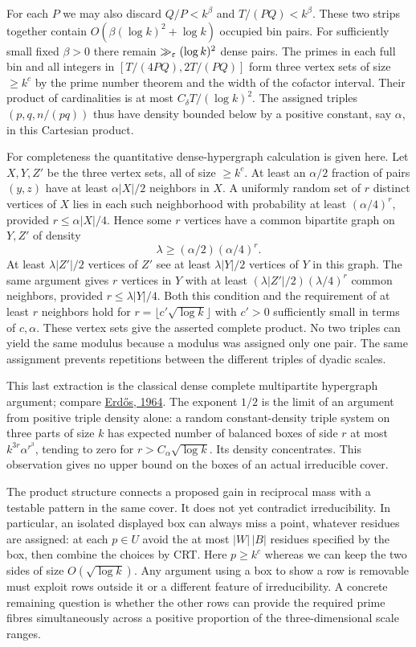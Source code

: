 For each $P$ we may also discard $Q/P<k^\beta$ and $T/(P Q)<k^\beta$. These two strips together contain $O(\beta(\log k)^2+\log k)$ occupied bin pairs. For sufficiently small fixed $\beta>0$ there remain $\gg_\varepsilon(\log k)^2$ dense pairs. The primes in each full bin and all integers in $[T/(4PQ),2T/(PQ)]$ form three vertex sets of size $\ge k^{c}$ by the prime number theorem and the width of the cofactor interval. Their product of cardinalities is at most $C_\delta T/(\log k)^2$. The assigned triples $(p,q,n/(pq))$ thus have density bounded below by a positive constant, say $\alpha$, in this Cartesian product.

\newpage
{}
For completeness the quantitative dense-hypergraph calculation is given here. Let $X,Y,Z'$ be the three vertex sets, all of size $\ge k^c$. At least an $\alpha/2$ fraction of pairs $(y,z)$ have at least $\alpha|X|/2$ neighbors in $X$. A uniformly random set of $r$ distinct vertices of $X$ lies in each such neighborhood with probability at least $(\alpha/4)^r$, provided $r\le\alpha|X|/4$. Hence some $r$ vertices have a common bipartite graph on $Y,Z'$ of density
\[
 \lambda\ge (\alpha/2)(\alpha/4)^r .
\]
At least $\lambda|Z'|/2$ vertices of $Z'$ see at least $\lambda |Y|/2$ vertices of $Y$ in this graph. The same argument gives $r$ vertices in $Y$ with at least $(\lambda |Z'|/2)(\lambda/4)^r$ common neighbors, provided $r\le\lambda |Y|/4$. Both this condition and the requirement of at least $r$ neighbors hold for $r=\lfloor c'\sqrt{\log k}\rfloor$ with $c'>0$ sufficiently small in terms of $c,\alpha$. These vertex sets give the asserted complete product. No two triples can yield the same modulus because a modulus was assigned only one pair. The same assignment prevents repetitions between the different triples of dyadic scales.

This last extraction is the classical dense complete multipartite hypergraph argument; compare \href{https://renyi.hu/~p_erdos/1964-13.pdf}{Erd\H os, 1964}. The exponent $1/2$ is the limit of an argument from positive triple density alone: a random constant-density triple system on three parts of size $k$ has expected number of balanced boxes of side $r$ at most $k^{3r}\alpha^{r^3}$, tending to zero for $r>C_\alpha\sqrt{\log k}$. Its density concentrates. This observation gives no upper bound on the boxes of an actual irreducible cover.

The product structure connects a proposed gain in reciprocal mass with a testable pattern in the same cover. It does not yet contradict irreducibility. In particular, an isolated displayed box can always miss a point, whatever residues are assigned: at each $p\in U$ avoid the at most $|W|\,|B|$ residues specified by the box, then combine the choices by CRT. Here $p\ge k^c$ whereas we can keep the two sides of size $O(\sqrt{\log k})$. Any argument using a box to show a row is removable must exploit rows outside it or a different feature of irreducibility. A concrete remaining question is whether the other rows can provide the required prime fibres simultaneously across a positive proportion of the three-dimensional scale ranges.
